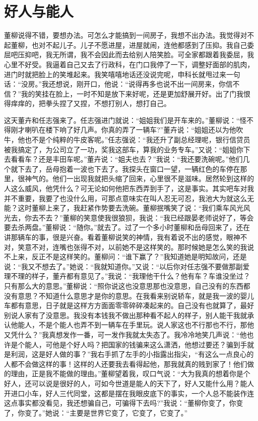 \documentclass[12pt,oneside]{book}
\begin{document}
\chapter{好人与能人}

董柳说得不错，要想办法。可怎么才能搞到一间房子，我想不出办法。我觉得对不起董柳，也对不起儿子。儿子不愿进屋，进屋就闹，连他都感到了压抑。我自己委屈吧压抑吧，我无所谓，我不会因此而去给别人陪笑脸。可全家都跟着我委屈，我心里不好受。我逼着自己又去了行政科，在门口我停了一下，调整好面部的肌肉，进门时就把脸上的笑堆起来。我笑嘻嘻地话还没说完呢，申科长就甩过来一句话：``没房。''我还想说，刚开口，他说：``说得再多也说不出一间房来，你信不信？''我的笑挂在脸上，一时不知是放下来好呢，还是更加舒展开好。出了门我恨得痒痒的，把拳头捏了又捏，不想打别人，想打自己。

这天董卉和任志强来了。任志强进门就说：``姐姐我们是开车来的。''董柳说：``怪不得刚才喇叭在楼下响了好几声。你真的弄了一辆车?''董卉说：``姐姐还以为他吹牛，他也不是个纯粹的牛皮客呢。''任志强说：``我还升了副总经理呢，银行信贷员被我搞定了，为公司立了一功，奖我这部车，算我的业务专车。''又说：``姐姐你下去看看车？还是丰田车呢。''董卉说：``姐夫也去？''我说：``我还要洗碗呢。''他们几个就下去了，岳母抱着一波也下去了。我探头在窗口一望，一辆红色的车停在那里，很神气的。他们一出现我就把头缩了回来，心里很不是滋味。居然轮到这样的人这么威风，他凭什么？可无论如何他把东西弄到手了，这是事实。其实吧车对我并不重要，我要了也没什么用，可那点意味实在叫人忍无可忍，我池大为就这么无能？这时董柳上来了，我赶紧作势要去洗碗。董柳抿嘴笑了说：``我们乘车风光风光去，你去不去？''董柳的笑意使我很狼狈，我说：``我已经跟晏老师说好了，等会要去杀两盘。''董柳说：``随你。''就去了。过了一个多小时董柳和岳母回来了，还在讲那辆车的事，很是兴奋。看着董柳说笑的神情，我有着说不出的感觉，眼神不对，笑意不对，连嘴也张得不对，以前她不是这样笑的。那时候她是怎么笑的我说不上来，反正不是这样笑的。董柳问：``谁下赢了？''我知道她是明知故问，还是说：``我又不想去了。''她说：``我就知道你。''又说：``以后你对任志强不要做那副爱理不理的样子，董卉都有意见了。''我说：``我理他干什么？他有车？车谁没坐过？只有那么大的意思。''董柳说：``照你说这也没意思那也没意思，自己没有的东西都没有意思？不知道什么意思才是你的意思。在我看来别说轿车，就是我一波的婴儿车都有意思，日子就是这样方方面面零零碎碎凑起来的。自己没有也就算了，最好别说人家有了没意思。我没有本钱我不做出那种看不起人的样子，别人能干我就承认他能人，不是个能人也弄不到一辆车在手里玩。说人家这也不行那也不行，那他又凭什么？''我真想发作一番，可一发作我就太失态了。我冷冷地笑几声说：``他也许是个能人，可他是个好人吗？把国家的钱骗来这么潇洒，他想过要还？骗到手就是利润，这是好人做的事？''我右手抓了左手的小指露出指尖，``有这么一点良心的人都不会做这样的事！这样的人还要我去看得起他，那我就真的贱到家了！他们做的理由，正是我不能做的理由。''董柳望着我，叹口气说：``大为我真的想着你是个好人，还可以说是很好的人，可如今世道是能人的天下了，好人又能什么用？能人开进口小车，好人三代同堂，这都是摆在我眼皮底下的事实，一个人总不能装作连这点事实都没看见，我还想骗自己，可骗得下去吗?''我说：``董柳你变了，你变了，你变了。''她说：``主要是世界它变了，它变了，它变了。''
\end{document}
